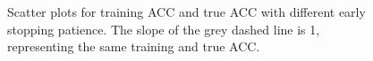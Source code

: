 \documentclass[12pt]{article}
\begin{document}
            \begin{figure}[htpb]
                \centering
                \caption{Scatter plots for training ACC and true ACC with different early stopping patience. The slope of the grey dashed line is 1, representing the same training and true ACC.}
                \label{fig:acc_scatter_patience_30}
            \end{figure}
\end{document}
